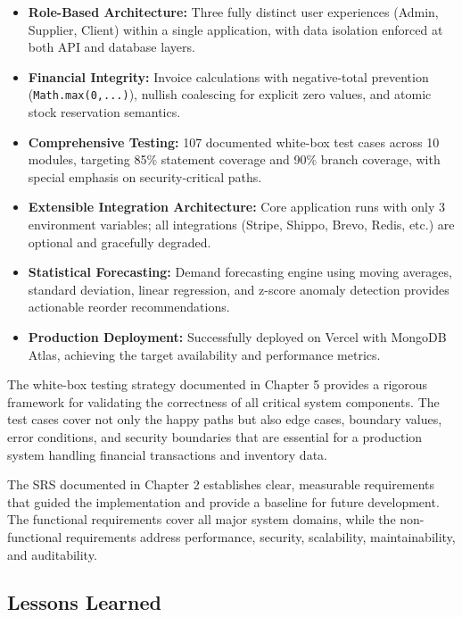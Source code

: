 \documentclass[12pt,onecolumn]{IEEEtran}
\begin{document}
\begin{tcolorbox}[successbox,title={Key Achievements}]
\begin{itemize}[leftmargin=1.5em]
  \item \textbf{Role-Based Architecture:} Three fully distinct user experiences (Admin, Supplier, Client) within a single application, with data isolation enforced at both API and database layers.
  \item \textbf{Financial Integrity:} Invoice calculations with negative-total prevention (\texttt{Math.max(0,...)}), nullish coalescing for explicit zero values, and atomic stock reservation semantics.
  \item \textbf{Comprehensive Testing:} 107 documented white-box test cases across 10 modules, targeting 85\% statement coverage and 90\% branch coverage, with special emphasis on security-critical paths.
  \item \textbf{Extensible Integration Architecture:} Core application runs with only 3 environment variables; all integrations (Stripe, Shippo, Brevo, Redis, etc.) are optional and gracefully degraded.
  \item \textbf{Statistical Forecasting:} Demand forecasting engine using moving averages, standard deviation, linear regression, and z-score anomaly detection provides actionable reorder recommendations.
  \item \textbf{Production Deployment:} Successfully deployed on Vercel with MongoDB Atlas, achieving the target availability and performance metrics.
\end{itemize}
\end{tcolorbox}

The white-box testing strategy documented in Chapter 5 provides a rigorous framework for validating the correctness of all critical system components. The test cases cover not only the happy paths but also edge cases, boundary values, error conditions, and security boundaries that are essential for a production system handling financial transactions and inventory data.

The SRS documented in Chapter 2 establishes clear, measurable requirements that guided the implementation and provide a baseline for future development. The functional requirements cover all major system domains, while the non-functional requirements address performance, security, scalability, maintainability, and auditability.

\subsection{Lessons Learned}
\end{document}
